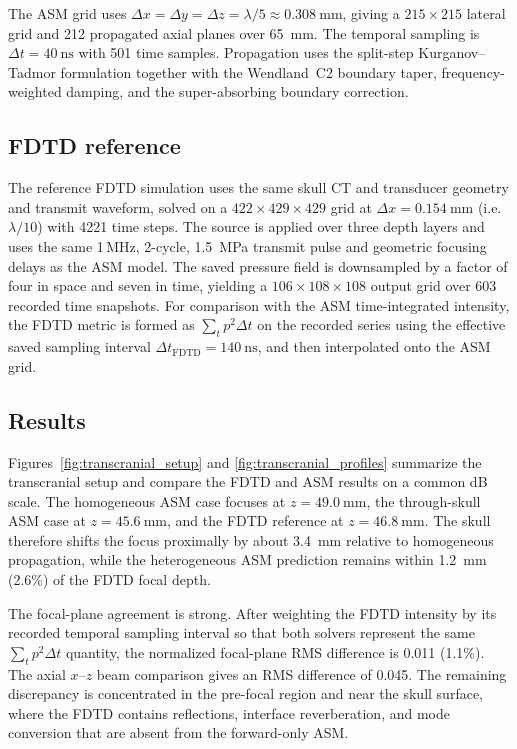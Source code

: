 \documentclass[11pt]{article}
\begin{document}
The ASM grid uses
$\Delta x = \Delta y = \Delta z = \lambda/5 \approx \SI{0.308}{\milli\meter}$,
giving a $215 \times 215$ lateral grid and 212 propagated axial planes
over \SI{65}{\milli\meter}.  The temporal sampling is
$\Delta t = \SI{40}{\nano\second}$ with 501 time samples.  Propagation
uses the split-step Kurganov--Tadmor formulation together with the
Wendland~C2 boundary taper, frequency-weighted damping, and the
super-absorbing boundary correction.

\subsection{FDTD reference}
\label{sec:transcranial:fdtd}

The reference FDTD simulation \cite{pinton2014} uses the same skull CT
and transducer geometry and transmit waveform, solved on a
$422 \times 429 \times 429$ grid at
$\Delta x = \SI{0.154}{\milli\meter}$ (i.e.\ $\lambda/10$) with 4221
time steps.  The source is applied over three depth layers and uses the
same 1\,MHz, 2-cycle, \SI{1.5}{\mega\pascal} transmit pulse and
geometric focusing delays as the ASM model.  The saved pressure field
is downsampled by a factor of four in space and seven in time, yielding
a $106 \times 108 \times 108$ output grid over 603 recorded time
snapshots.  For comparison with the ASM time-integrated intensity, the
FDTD metric is formed as $\sum_t p^2 \Delta t$ on the recorded series
using the effective saved sampling interval
$\Delta t_{\mathrm{FDTD}} = \SI{140}{\nano\second}$, and then
interpolated onto the ASM grid.

\subsection{Results}
\label{sec:transcranial:results}

Figures~\ref{fig:transcranial_setup} and \ref{fig:transcranial_profiles}
summarize the transcranial setup and compare the FDTD and ASM results
on a common dB scale.
The homogeneous ASM case focuses at
$z = \SI{49.0}{\milli\meter}$, the through-skull ASM case at
$z = \SI{45.6}{\milli\meter}$, and the FDTD reference at
$z = \SI{46.8}{\milli\meter}$.  The skull therefore shifts the focus
proximally by about \SI{3.4}{\milli\meter} relative to homogeneous
propagation, while the heterogeneous ASM prediction remains within
\SI{1.2}{\milli\meter} (2.6\%) of the FDTD focal depth.

The focal-plane agreement is strong.  After weighting the FDTD
intensity by its recorded temporal sampling interval so that both
solvers represent the same $\sum_t p^2 \Delta t$ quantity, the
normalized focal-plane RMS difference is 0.011 (1.1\%).  The axial
$x$--$z$ beam comparison gives an RMS difference of 0.045.  The
remaining discrepancy is concentrated in the pre-focal region and near
the skull surface, where the FDTD contains reflections, interface
reverberation, and mode conversion that are absent from the
forward-only ASM.
\end{document}
